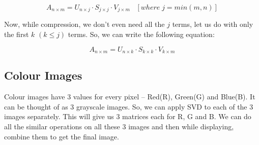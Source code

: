 		$$A_{n\times m} = U_{n\times j}\cdot S_{j\times j}\cdot V_{j\times m}\;\;\;[where\;j = min(m, n)]$$

		Now, while compression, we don't even need all the $j$ terms, let us do with only the first $k$ $(k\leq j)$ terms. So, we can write the following equation:

		$$A_{n\times m} = U_{n\times k}\cdot S_{k\times k}\cdot V_{k\times m}$$

	\subsection{Colour Images}
		Colour images have 3 values for every pixel -- Red(R), Green(G) and Blue(B). It can be thought of as 3 grayscale images. So, we can apply SVD to each of the 3 images separately. This will give us 3 matrices each for R, G and B. We can do all the similar operations on all these 3 images and then while displaying, combine them to get the final image.


























